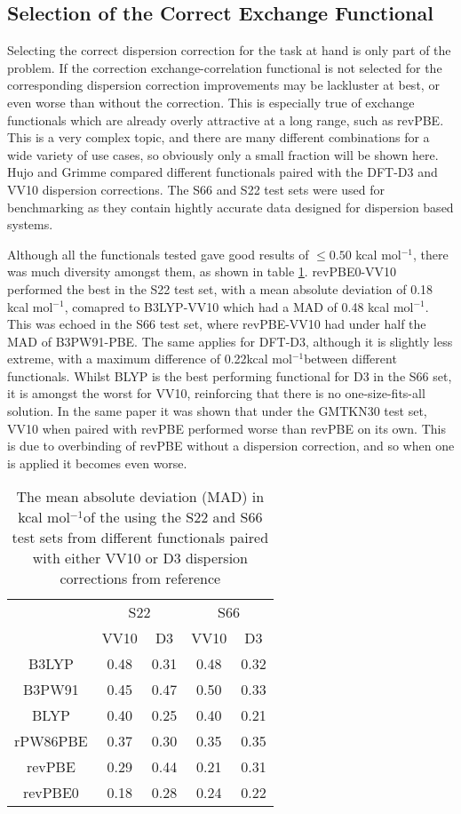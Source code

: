 \documentclass[10pt,a4paper,twocolumn,twoside]{extarticle}
\newcommand{\kcal}{kcal mol\(^{-1}\)}
\begin{document}
	\subsection{Selection of the Correct Exchange Functional}
	Selecting the correct dispersion correction for the task at hand is only part of the problem. If the correction exchange-correlation functional is not selected for the corresponding dispersion correction improvements may be lackluster at best, or even worse than without the correction. This is especially true of exchange functionals which are already overly attractive at a long range, such as revPBE. This is a very complex topic, and there are many different combinations for a wide variety of use cases, so obviously only a small fraction will be shown here. 
	Hujo and Grimme compared different functionals paired with the DFT-D3 and VV10 dispersion corrections.\cite{Grimme2011-D3-VV10-Compairons} The S66\cite{s66a,s66b} and S22\cite{s22} test sets were used for benchmarking as they contain hightly accurate data designed for dispersion based systems. 

	Although all the functionals tested gave good results of $\leq 0.50$ \kcal, there was much diversity amongst them, as shown in table \ref{tab:VV10D3}. revPBE0-VV10 performed the best in the S22 test set, with a mean absolute deviation of 0.18 \kcal, comapred to B3LYP-VV10 which had a MAD of 0.48 \kcal. This was echoed in the S66 test set, where revPBE-VV10 had under half the MAD of B3PW91-PBE. The same applies for DFT-D3, although it is slightly less extreme, with a maximum difference of 0.22\kcal between different functionals. Whilst BLYP is the best performing functional for D3 in the S66 set, it is amongst the worst for VV10, reinforcing that there is no one-size-fits-all solution.
	In the same paper it was shown that under the GMTKN30 test set, VV10 when paired with revPBE performed worse than revPBE on its own. This is due to overbinding of revPBE without a dispersion correction, and so when one is applied it becomes even worse. 

	\begin{table}
		\centering
		\begin{tabular}[]{c|c c c c}
					& \multicolumn{2}{c}{S22} & \multicolumn{2}{c}{S66}\\
					& VV10 & D3 & VV10 & D3\\
					\hline
			B3LYP   & 0.48 & 0.31 & 0.48 & 0.32\\
			B3PW91  & 0.45 & 0.47 & 0.50 & 0.33\\
			BLYP    & 0.40 & 0.25 & 0.40 & 0.21\\
			rPW86PBE& 0.37 & 0.30 & 0.35 & 0.35\\
			revPBE  & 0.29 & 0.44 & 0.21 & 0.31\\
			revPBE0 & 0.18 & 0.28 & 0.24 & 0.22\\
		\end{tabular}
		\caption{The mean absolute deviation (MAD) in \kcal of the using the S22 and S66 test sets from different functionals paired with either VV10 or D3 dispersion corrections from reference \cite{Grimme2011-VV10-LDA-GGA-Pairing}}
		\label{tab:VV10D3}
	\end{table}
\end{document}
